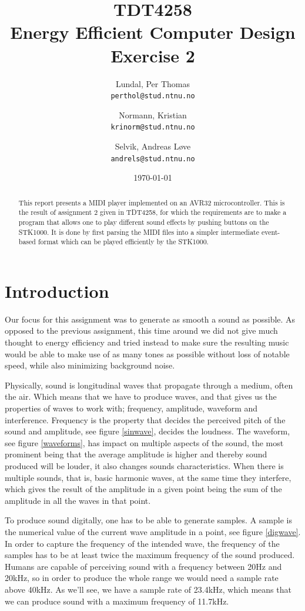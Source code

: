 \documentclass[a4paper,12pt]{article}
\title{TDT4258 \\ Energy Efficient Computer Design \\ Exercise 2}
\author{
    Lundal, Per Thomas \\ \texttt{perthol@stud.ntnu.no}
    \and
    Normann, Kristian \\ \texttt{krinorm@stud.ntnu.no}
    \and
    Selvik, Andreas Løve \\ \texttt{andrels@stud.ntnu.no}
}
\date{\today}
\begin{document}
\maketitle
\begin{abstract}

This report presents a MIDI player implemented on an AVR32 microcontroller\cite{avr32}. This is the result of assignment 2 given in TDT4258, for which the requirements are to make a program that allows one to play different sound effects by pushing buttons on the STK1000. It is done by first parsing the MIDI files into a simpler intermediate event-based format which can be played efficiently by the STK1000.

\end{abstract}

\newpage
\tableofcontents

\clearpage
\section{Introduction}
Our focus for this assignment was to generate as smooth a sound as possible. As opposed to the previous assignment, this time around we did not give much thought to energy efficiency and tried instead to make sure the resulting music would be able to make use of as many tones as possible without loss of notable speed, while also minimizing background noise.

Physically, sound is longitudinal waves that propagate through a medium, often the air. Which means that we have to produce waves, and that gives us the properties of waves to work with; frequency, amplitude, waveform and interference. Frequency is the property that decides the perceived pitch of the sound and amplitude, see figure \ref{sinwave}, decides the loudness. The waveform, see figure \ref{waveforms}, has impact on multiple aspects of the sound, the most prominent being that the average amplitude is higher and thereby sound produced will be louder, it also changes sounds characteristics. When there is multiple sounds, that is, basic harmonic waves, at the same time they interfere, which gives the result of the amplitude in a given point being the sum of the amplitude in all the waves in that point. 

To produce sound digitally, one has to be able to generate samples. A sample is the numerical value of the current wave amplitude in a point, see figure \ref{digwave}. In order to capture the frequency of the intended wave, the frequency of the samples has to be at least twice the maximum frequency of the sound produced. Humans are capable of perceiving sound with a frequency between 20Hz and 20kHz, so in order to produce the whole range we would need a sample rate above 40kHz. As we’ll see, we have a sample rate of 23.4kHz, which means that we can produce sound with a maximum frequency of 11.7kHz. 
\end{document}
